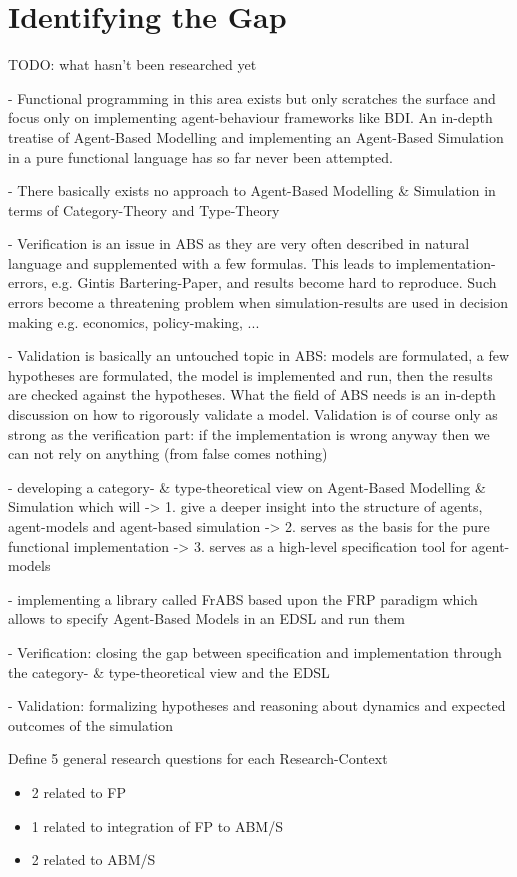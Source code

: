 \section{Identifying the Gap}
TODO: what hasn't been researched yet

- Functional programming in this area exists but only scratches the surface and focus only on implementing agent-behaviour frameworks like BDI. An in-depth treatise of Agent-Based Modelling and implementing an Agent-Based Simulation in a pure functional language has so far never been attempted.

- There basically exists no approach to Agent-Based Modelling \& Simulation in terms of Category-Theory and Type-Theory

- Verification is an issue in ABS as they are very often described in natural language and supplemented with a few formulas. This leads to implementation-errors, e.g. Gintis Bartering-Paper, and results become hard to reproduce. Such errors become a threatening problem when simulation-results are used in decision making e.g. economics, policy-making, ...

- Validation is basically an untouched topic in ABS: models are formulated, a few hypotheses are formulated, the model is implemented and run, then the results are checked against the hypotheses. What the field of ABS needs is an in-depth discussion on how to rigorously validate a model. Validation is of course only as strong as the verification part: if the implementation is wrong anyway then we can not rely on anything (from false comes nothing)

- developing a category- \& type-theoretical view on Agent-Based Modelling \& Simulation which will 
	-> 1. give a deeper insight into the structure of agents, agent-models and agent-based simulation
	-> 2. serves as the basis for the pure functional implementation
	-> 3. serves as a high-level specification tool for agent-models

- implementing a library called FrABS based upon the FRP paradigm which allows to specify Agent-Based Models in an EDSL and run them

- Verification: closing the gap between specification and implementation through the category- \& type-theoretical view and the EDSL

- Validation: formalizing hypotheses and reasoning about dynamics and expected outcomes of the simulation

Define 5 general research questions for each Research-Context
	\begin{itemize}
    \item 2 related to FP
    \item 1 related to integration of FP to ABM/S
    \item 2 related to ABM/S
    \end{itemize}
    

